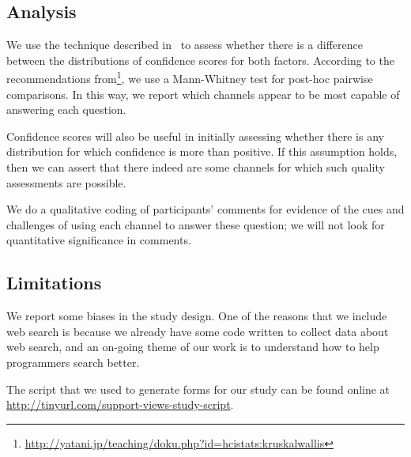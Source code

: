 \subsection{Analysis}

We use the technique described in~\cite{kaptein_powerful_2010} to assess whether there is a difference between the distributions of confidence scores for both factors.
According to the recommendations from\footnote{\url{http://yatani.jp/teaching/doku.php?id=hcistats:kruskalwallis}}, we use a Mann-Whitney test for post-hoc pairwise comparisons.
In this way, we report which channels appear to be most capable of answering each question.

Confidence scores will also be useful in initially assessing whether there is any distribution for which confidence is more than positive.
If this assumption holds, then we can assert that there indeed are some channels for which such quality assessments are possible.

We do a qualitative coding of participants' comments for evidence of the cues and challenges of using each channel to answer these question; we will not look for quantitative significance in comments.

\subsection{Limitations}

We report some biases in the study design.
One of the reasons that we include web search is because we already have some code written to collect data about web search, and an on-going theme of our work is to understand how to help programmers search better.

The script that we used to generate forms for our study can be found online at \url{http://tinyurl.com/support-views-study-script}.
\fi
